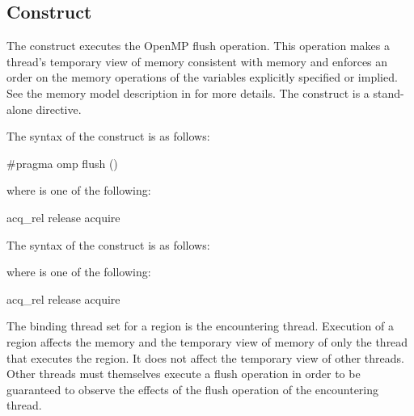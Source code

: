 \subsection{ Construct}
\label{subsec:flush Construct}
\summary
The  construct executes the OpenMP flush operation. This operation makes a
thread's temporary view of memory consistent with memory and enforces an order on
the memory operations of the variables explicitly specified or implied. See the memory
model description in  for more details. The  
construct is a stand-alone directive.

\syntax
\begin{ccppspecific}
The syntax of the  construct is as follows:

\begin{ompcPragma}
#pragma omp flush  \plc{[}()\plc{] new-line}
\end{ompcPragma}
\begin{samepage}
where  is one of the following:

\begin{indentedcodelist}
acq_rel
release
acquire
\end{indentedcodelist}
\end{samepage}
\end{ccppspecific}

\begin{fortranspecific}
The syntax of the  construct is as follows:

\begin{samepage} %
where  is one of the following:

\begin{indentedcodelist}
acq_rel
release
acquire
\end{indentedcodelist}
\end{samepage}
\end{fortranspecific}

\binding
The binding thread set for a  region is the encountering thread. 
Execution of a  region affects the memory and the temporary view 
of memory of only the thread that executes the region. It does not affect the 
temporary view of other threads. Other threads must themselves execute a flush 
operation in order to be guaranteed to observe the effects of the flush operation
of the encountering thread.

